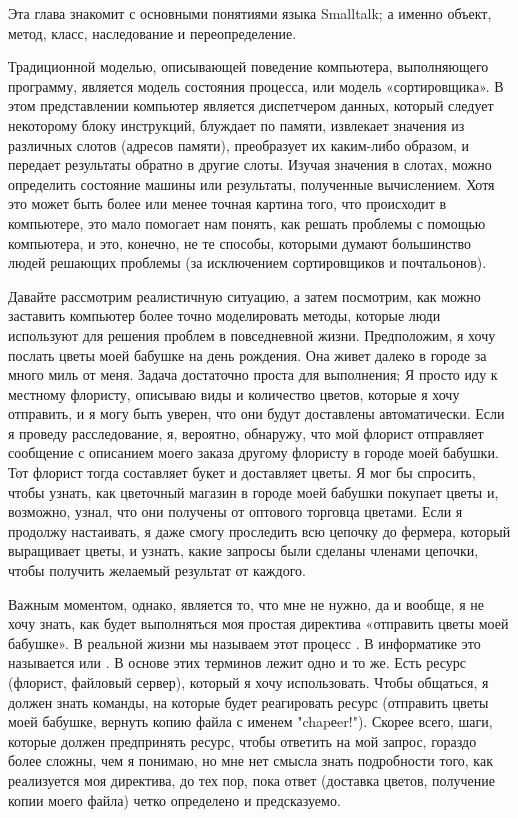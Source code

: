 \secdown

Эта глава знакомит с основными понятиями языка Smalltalk; а именно объект, метод, класс, наследование и переопределение.

\bigskip

Традиционной моделью, описывающей поведение компьютера, выполняющего программу, 
является модель состояния процесса, или модель «сортировщика». В этом 
представлении компьютер является диспетчером данных, который следует некоторому 
блоку инструкций, блуждает по памяти, извлекает значения из различных слотов 
(адресов памяти), преобразует их каким-либо образом, и передает результаты 
обратно в другие слоты. Изучая значения в слотах, можно определить состояние 
машины или результаты, полученные вычислением. Хотя это может быть более или 
менее точная картина того, что происходит в компьютере, это мало помогает нам 
понять, как решать проблемы с помощью компьютера, и это, конечно, не те способы, 
которыми думают большинство людей решающих проблемы (за исключением сортировщиков и почтальонов).

Давайте рассмотрим реалистичную ситуацию, а затем посмотрим, как можно заставить 
компьютер более точно моделировать методы, которые люди используют для решения 
проблем в повседневной жизни. Предположим, я хочу послать цветы моей бабушке 
на день рождения. Она живет далеко в городе за много миль от меня. Задача 
достаточно проста для выполнения; Я просто иду к местному флористу, описываю 
виды и количество цветов, которые я хочу отправить, и я могу быть уверен, 
что они будут доставлены автоматически. Если я проведу расследование, я, 
вероятно, обнаружу, что мой флорист отправляет сообщение с описанием моего 
заказа другому флористу в городе моей бабушки. Тот флорист тогда составляет 
букет и доставляет цветы. Я мог бы спросить, чтобы узнать, как цветочный 
магазин в городе моей бабушки покупает цветы и, возможно, узнал, что они 
получены от оптового торговца цветами. Если я продолжу настаивать, я даже 
смогу проследить всю цепочку до фермера, который выращивает цветы, и узнать, 
какие запросы были сделаны членами цепочки, чтобы получить желаемый результат от каждого.

Важным моментом, однако, является то, что мне не нужно, да и вообще, 
я не хочу знать, как будет выполняться моя простая директива 
«отправить цветы моей бабушке». В реальной жизни мы называем этот 
процесс . В информатике это называется 
 или . В основе этих терминов лежит 
одно и то же. Есть ресурс (флорист, файловый сервер), который я хочу 
использовать. Чтобы общаться, я должен знать команды, на которые будет 
реагировать ресурс (отправить цветы моей бабушке, вернуть копию файла 
с именем "chapеer!"). Скорее всего, шаги, которые должен предпринять 
ресурс, чтобы ответить на мой запрос, гораздо более сложны, чем я 
понимаю, но мне нет смысла знать подробности того, как реализуется 
моя директива, до тех пор, пока ответ (доставка цветов, получение 
копии моего файла) четко определено и предсказуемо.

